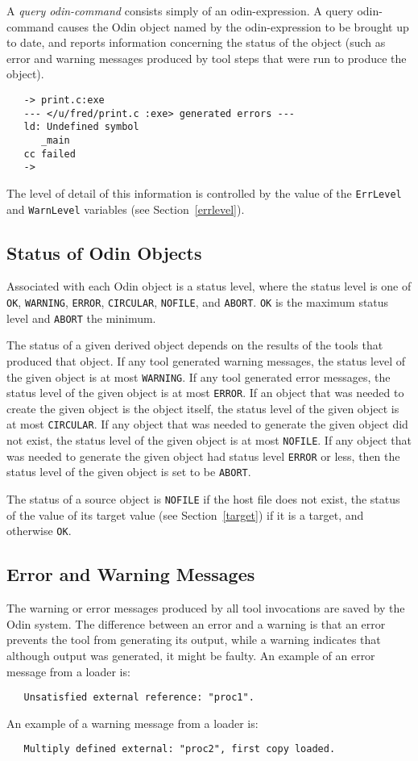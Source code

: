 \documentclass[hidelinks]{report}
\newcommand{\ex}{\tt}   %
\begin{document}
A {\em query odin-command} consists simply of an odin-expression.
A query odin-command causes the Odin object named by the odin-expression
to be brought up to date,
and reports information concerning the status of the object
(such as error and warning messages produced by tool steps that were run
to produce the object).
\begin{verbatim}
   -> print.c:exe
   --- </u/fred/print.c :exe> generated errors ---
   ld: Undefined symbol 
      _main 
   cc failed
   ->
\end{verbatim}
The level of detail of this information is controlled by the value of the
{\ex ErrLevel} and {\ex WarnLevel} variables (see Section~\ref{errlevel}).

\subsection{Status of Odin Objects}

Associated with each Odin object is a status level,
where the status level is one of {\ex OK}, {\ex WARNING}, {\ex ERROR},
{\ex CIRCULAR}, {\ex NOFILE}, and {\ex ABORT}.
{\ex OK} is the maximum status level and {\ex ABORT} the minimum.

The status of a given derived object depends on
the results of the tools that produced that object.
If any tool generated warning messages,
the status level of the given object is at most {\ex WARNING}.
If any tool generated error messages,
the status level of the given object is at most {\ex ERROR}.
If an object that was needed to create the
given object is the object itself,
the status level of the given object is at most {\ex CIRCULAR}.
If any object that was needed to generate the given object did not exist,
the status level of the given object is at most {\ex NOFILE}.
If any object that was needed to
generate the given object had status level {\ex ERROR} or less,
then the status level of the given object is set to be {\ex ABORT}.

The status of a source object is {\ex NOFILE}
if the host file does not exist,
the status of the value of its target value (see Section~\ref{target})
if it is a target, and otherwise {\ex OK}.

\subsection{Error and Warning Messages}

The warning or error messages produced by all tool invocations
are saved by the Odin system.
The difference between an error and a warning is that
an error prevents the tool from generating its output,
while a warning indicates that although output was generated,
it might be faulty.
An example of an error message from a loader is:
\begin{verbatim}
   Unsatisfied external reference: "proc1".
\end{verbatim}
An example of a warning message from a loader is:
\begin{verbatim}
   Multiply defined external: "proc2", first copy loaded.
\end{verbatim}
\end{document}
